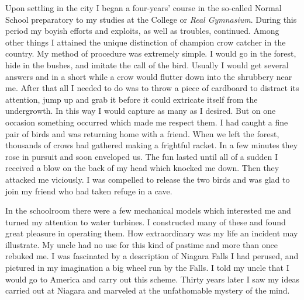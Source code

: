 \documentclass[a4paper,12pt,english,twoside,openright]{memoir}
\begin{document}
	Upon settling in the city I began a four-years' course in the so-called Normal School preparatory 
	to my studies at the College or \emph{Real Gymnasium}.  During this period my boyish efforts and 
	exploits, as well as troubles, continued.  Among other things I attained the unique distinction of 
	champion crow catcher in the country.  My method of procedure was extremely simple.  I would 
	go in the forest, hide in the bushes, and imitate the call of the bird.  Usually I would get several 
	answers and in a short while a crow would flutter down into the shrubbery near me.  After that all I 
	needed to do was to throw a piece of cardboard to distract its attention, jump up and grab it 
	before it could extricate itself from the undergrowth.  In this way I would capture as many as I 
	desired.  But on one occasion something occurred which made me respect them.  I had caught a 
	fine pair of birds and was returning home with a friend.  When we left the forest, thousands of 
	crows had gathered making a frightful racket.  In a few minutes they rose in pursuit and soon 
	enveloped us.  The fun lasted until all of a sudden I received a blow on the back of my head 
	which knocked me down.  Then they attacked me viciously.  I was compelled to release the two 
	birds and was glad to join my friend who had taken refuge in a cave.  
	
	In the schoolroom there were a few mechanical models which interested me and turned my 
	attention to water turbines.  I constructed many of these and found great pleasure in operating 
	them.  How extraordinary was my life an incident may illustrate.  My uncle had no use for this kind 
	of pastime and more than once rebuked me.  I was fascinated by a description of Niagara Falls I 
	had perused, and pictured in my imagination a big wheel run by the Falls.  I told my uncle that I 
	would go to America and carry out this scheme.  Thirty years later I saw my ideas carried out at 
	Niagara and marveled at the unfathomable mystery of the mind.  
	
\end{document}
